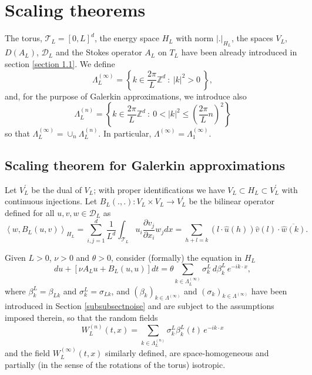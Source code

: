 \documentclass[11pt]{preprint}
\newcommand{\ZZ}{\mathbb{Z}}
\begin{document}
\section{Scaling theorems}\label{appendixtwo}

The torus, $\mathcal{T}_{L}=\left[  0,L\right]  ^{d}$, the energy space
$H_{L}$ with norm $\left|  .\right|  _{H_{L}}$, the spaces $V_{L}$, $D\left(
A_{L}\right)  $, $\mathcal{D}_{L}$ and the Stokes operator $A_{L}$ on $T_{L}$
have been already introduced in section \ref{section 1.1}. We define
\begin{equation}\label{LambdaL}
\Lambda^{(\infty)}_L=\left\{ k\in\frac{2\pi}{L}\ZZ^d\ :\ |k|^2>0\ \right\},
\end{equation}
and, for the purpose of Galerkin approximations, we introduce also
\[
\Lambda^{(n)}_L
=\left\{ k\in\frac{2\pi}{L}\ZZ^d\ :\ 0<|k|^2\leq\left(\frac{2\pi}{L}n\right)^2\right\}
\]
so that $\Lambda^{(\infty)}_L=\cup_{n}\Lambda^{(n)}_L$. In particular,
$\Lambda^{(\infty)}=\Lambda^{(\infty)}_1$. 

\subsection{Scaling theorem for Galerkin approximations}

Let $V_{L}^{\prime}$ be the dual of $V_{L}$; with proper identifications we
have $V_{L}\subset H_{L}\subset V_{L}^{\prime}$ with continuous injections.
Let $B_{L}\left(  .,.\right)  :V_{L}\times V_{L}\rightarrow V_{L}^{\prime}$ be
the bilinear operator defined for all $u,v,w\in\mathcal{D}_{L}$ as
\begin{equation}\label{nonlinop}
\left\langle w,B_{L}\left(  u,v\right)  \right\rangle _{H_{L}}=\sum
_{i,j=1}^{d}\frac{1}{L^d}\int_{\mathcal{T}_L}u_{i}\frac{\partial v_{j}}{\partial x_{i}}%
w_{j}dx
=\sum_{h+l=k}\left(l\cdot\widehat{u}(h)\right)\widehat{v}(l)\cdot
\overline{\widehat{w}(k)}.
\end{equation}

Given $L>0$, $\nu>0$ and $\theta>0$, consider (formally) the equation in $H_{L}$
\[
du+\left[  \nu A_{L}u+B_{L}\left(  u,u\right)  \right]  dt=\theta\sum_{
k\in\Lambda^{(\infty)}_L}\sigma_k^L\,d\beta_k^L\,e^{-i k\cdot x},
\]
where $\beta_k^L=\beta_{Lk}$ and $\sigma_k^L=\sigma_{Lk}$, and
$(\beta_k)_{k\in\Lambda^{(\infty)}}$ and $(\sigma_k)_{k\in\Lambda^{(\infty)}}$
have been introduced in Section \ref{subsubsectnoise} and
are subject to the assumptions imposed therein, so that the random fields
\[
W_{L}^{(n)}(t,x)=\sum_{k\in\Lambda^{(n)}_L}\sigma_k^L\beta_k^L(t)
\,e^{-i k\cdot x}
\]
and the field $W_{L}^{\left(  \infty\right)  }\left(  t,x\right)  $ similarly
defined, are space-homogeneous and partially (in the sense of the rotations of
the torus) isotropic.
\end{document}
